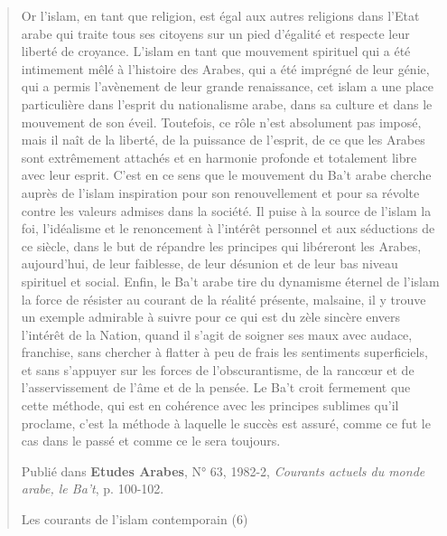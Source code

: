 \begin{quote}
Or l'islam, en tant que religion, est égal aux autres religions dans
l'Etat arabe qui traite tous ses citoyens sur un pied d'égalité et
respecte leur liberté de croyance. L'islam en tant que mouvement
spirituel qui a été intimement mêlé à l'histoire des Arabes, qui a été
imprégné de leur génie, qui a permis l'avènement de leur grande
renaissance, cet islam a une place particulière dans l'esprit du
nationalisme arabe, dans sa culture et dans le mouvement de son éveil.
Toutefois, ce rôle n'est absolument pas imposé, mais il naît de la
liberté, de la puissance de l'esprit, de ce que les Arabes sont
extrêmement attachés et en harmonie profonde et totalement libre avec
leur esprit. C'est en ce sens que le mouvement du Ba't arabe cherche
auprès de l'islam inspiration pour son renouvellement et pour sa révolte
contre les valeurs admises dans la société. Il puise à la source de
l'islam la foi, l'idéalisme et le renoncement à l'intérêt personnel et
aux séductions de ce siècle, dans le but de répandre les principes qui
libéreront les Arabes, aujourd'hui, de leur faiblesse, de leur désunion
et de leur bas niveau spirituel et social. Enfin, le Ba't arabe tire du
dynamisme éternel de l'islam la force de résister au courant de la
réalité présente, malsaine, il y trouve un exemple admirable à suivre
pour ce qui est du zèle sincère envers l'intérêt de la Nation, quand il
s'agit de soigner ses maux avec audace, franchise, sans chercher à
flatter à peu de frais les sentiments superficiels, et sans s'appuyer
sur les forces de l'obscurantisme, de la rancœur et de l'asservissement
de l'âme et de la pensée. Le Ba't croit fermement que cette méthode, qui
est en cohérence avec les principes sublimes qu'il proclame, c'est la
méthode à laquelle le succès est assuré, comme ce fut le cas dans le
passé et comme ce le sera toujours.

Publié dans \textbf{Etudes Arabes}, N° 63, 1982-2, \emph{Courants
actuels du monde arabe, le Ba't}, p. 100-102.

Les courants de l'islam contemporain (6)
\end{quote}

